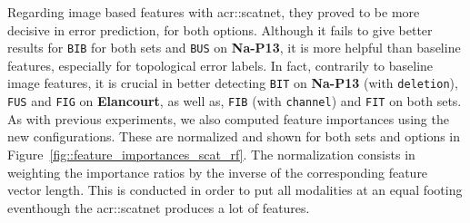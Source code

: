             Regarding image based features with \gls{acr::scatnet}, they proved to be more decisive in error prediction, for both options.
            Although it fails to give better results for \texttt{BIB} for both sets and \texttt{BUS} on \textbf{Na-P13}, it is more helpful than baseline features, especially for topological error labels.
            In fact, contrarily to baseline image features, it is crucial in better detecting \texttt{BIT} on \textbf{Na-P13} (with \texttt{deletion}), \texttt{FUS} and \texttt{FIG} on \textbf{Elancourt}, as well as, \texttt{FIB} (with \texttt{channel}) and \texttt{FIT} on both sets.\\

            As with previous experiments, we also computed feature importances using the new configurations.
            These are normalized and shown for both sets and options in Figure~\ref{fig::feature_importances_scat_rf}.
            The normalization consists in weighting the importance ratios by the inverse of the corresponding feature vector length.
            This is conducted in order to put all modalities at an equal footing eventhough the \gls{acr::scatnet} produces a lot of features.\\

